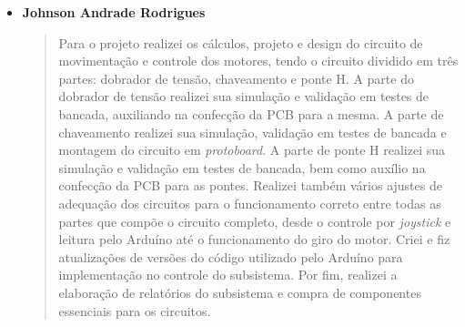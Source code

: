 \begin{itemize}
  \item \textbf{Johnson Andrade Rodrigues}
    \begin{quote}
      Para o projeto realizei os cálculos, projeto e design do circuito de
      movimentação e controle dos motores, tendo o circuito dividido em três
      partes: dobrador de tensão, chaveamento e ponte H. A parte do dobrador de
      tensão realizei sua simulação e validação em testes de bancada, auxiliando
      na confecção da PCB para a mesma. A parte de chaveamento realizei sua
      simulação, validação em testes de bancada e montagem do circuito em
      \textit{protoboard}. A parte de ponte H realizei sua simulação e validação
      em testes de bancada, bem como auxílio na confecção da PCB para as pontes.
      Realizei também vários ajustes de adequação dos circuitos para o
      funcionamento correto entre todas as partes que compõe o circuito completo,
      desde o controle por \textit{joystick} e leitura pelo Arduíno até o funcionamento
      do giro do motor. Criei e fiz atualizações de versões do código utilizado
      pelo Arduíno para implementação no controle do subsistema. Por fim, realizei
      a elaboração de relatórios do subsistema e compra de componentes essenciais
      para os circuitos.
    \end{quote}
\end{itemize}
